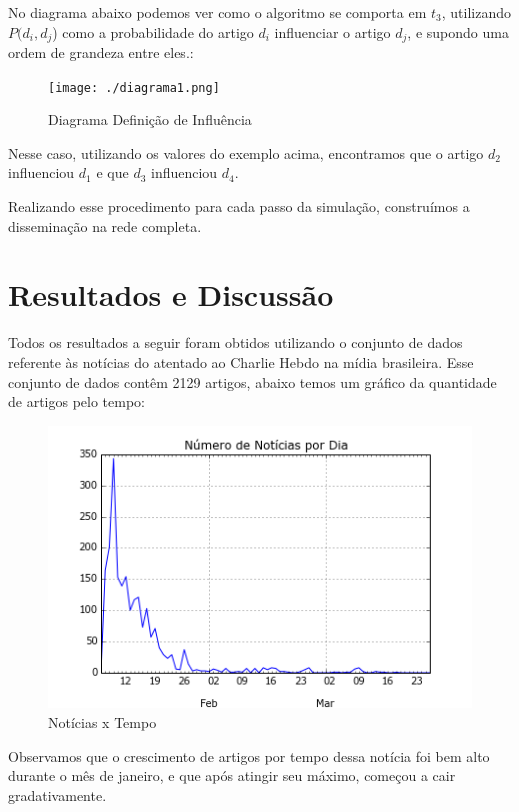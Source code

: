 \documentclass[a4paper,12pt]{article}
\begin{document}
  No diagrama abaixo podemos ver como o algoritmo se comporta em $t_{3}$, utilizando $P(d_{i},d_{j}$) como a probabilidade do artigo
  $d_{i}$ influenciar o artigo $d_{j}$, e supondo uma ordem de grandeza entre eles.:
  
  \begin{figure}[h]
    \centering
    \texttt{[image: ./diagrama1.png]}
    \caption{Diagrama Definição de Influência}
  \end{figure}

  Nesse caso, utilizando os valores do exemplo acima, encontramos que o artigo $d_{2}$ influenciou $d_{1}$ e que $d_{3}$ influenciou
  $d_{4}$.
  
  Realizando esse procedimento para cada passo da simulação, construímos a disseminação na rede completa.

  
\pagebreak  
\section{Resultados e Discussão}
 
Todos os resultados a seguir foram obtidos utilizando o conjunto de dados referente às notícias do atentado ao Charlie Hebdo na mídia
brasileira. 
Esse conjunto de dados contêm 2129 artigos, abaixo temos um gráfico da quantidade de artigos pelo tempo:

\begin{figure}[h]
 \centering
 \includegraphics[scale=0.7]{./grafic.png}
 \caption{Notícias x Tempo}
\end{figure}

Observamos que o crescimento de artigos por tempo dessa notícia foi bem alto durante o mês de janeiro, e que após atingir seu máximo, começou
a cair gradativamente.
\end{document}
